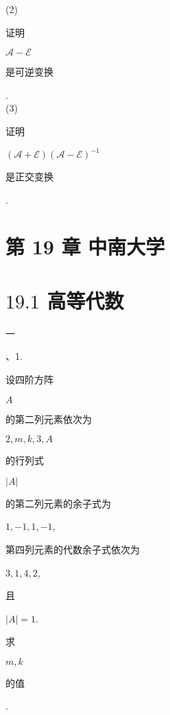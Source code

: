 \documentclass[10pt]{article}
\begin{document}
(2) \begin{CJK}{UTF8}{mj}证明\end{CJK} $\mathscr{A}-\mathscr{E}$ \begin{CJK}{UTF8}{mj}是可逆变换\end{CJK}.\\
(3) \begin{CJK}{UTF8}{mj}证明\end{CJK} $(\mathscr{A}+\mathscr{E})(\mathscr{A}-\mathscr{E})^{-1}$ \begin{CJK}{UTF8}{mj}是正交变换\end{CJK}.

\section{第 19 章 中南大学}
\section{$19.1$ 高等代数}
\begin{CJK}{UTF8}{mj}一\end{CJK}、1. \begin{CJK}{UTF8}{mj}设四阶方阵\end{CJK} $A$ \begin{CJK}{UTF8}{mj}的第二列元素依次为\end{CJK} $2, m, k, 3, A$ \begin{CJK}{UTF8}{mj}的行列式\end{CJK} $|A|$ \begin{CJK}{UTF8}{mj}的第二列元素的余子式为\end{CJK} $1,-1,1,-1$, \begin{CJK}{UTF8}{mj}第四列元素的代数余子式依次为\end{CJK} $3,1,4,2$, \begin{CJK}{UTF8}{mj}且\end{CJK} $|A|=1$. \begin{CJK}{UTF8}{mj}求\end{CJK} $m, k$ \begin{CJK}{UTF8}{mj}的值\end{CJK}.
\end{document}
